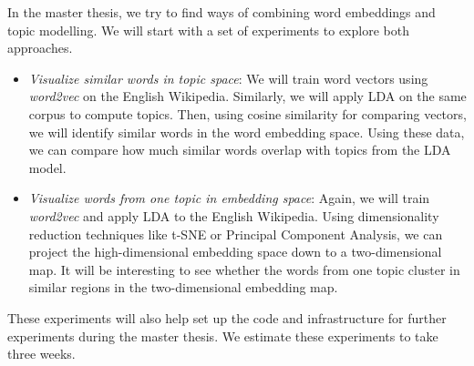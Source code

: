 \documentclass{sig-alternate-05-2015}
\begin{document}
In the master thesis, we try to find ways of combining word embeddings and topic modelling.
We will start with a set of experiments to explore both approaches.
\begin{itemize}
       \item
              \emph{Visualize similar words in topic space}:
              We will train word vectors using \emph{word2vec} on the English Wikipedia.
              Similarly, we will apply LDA on the same corpus to compute topics.
              Then, using cosine similarity for comparing vectors, we will identify similar words in the word embedding space.
              Using these data, we can compare how much similar words overlap with topics from the LDA model.
       \item
              \emph{Visualize words from one topic in embedding space}:
              Again, we will train \emph{word2vec} and apply LDA to the English Wikipedia.
              Using dimensionality reduction techniques like t-SNE\cite{VanDerMaaten2008} or Principal Component Analysis, we can project the high-dimensional embedding space down to a two-dimensional map.
              It will be interesting to see whether the words from one topic cluster in similar regions in the two-dimensional embedding map.
\end{itemize}
These experiments will also help set up the code and infrastructure for further experiments during the master thesis.
We estimate these experiments to take three weeks.

\end{document}

